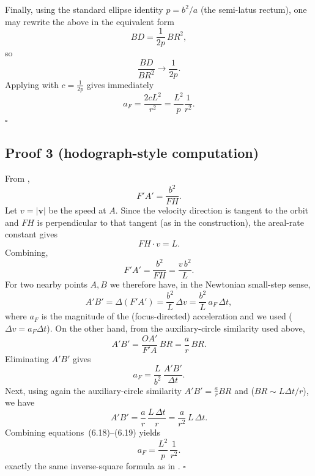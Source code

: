 Finally, using the standard ellipse identity $p=b^2/a$ (the semi-latus rectum), one may rewrite the above in the equivalent form
\begin{equation}
  BD=\frac{1}{2p}\,BR^2,
\end{equation}
so
\[
  \frac{BD}{BR^2}\to \frac{1}{2p}.
\]
Applying  with $c=\frac{1}{2p}$ gives immediately
\[
  a_F=\frac{2cL^2}{r^2}=\frac{L^2}{p}\frac{1}{r^2}.
\]
\hfill$\square$

\subsection{Proof 3 (hodograph-style computation)}
\label{subsec:proof3-hodograph}

From ,
\begin{equation}
  F'\!A'=\frac{b^2}{FH}.
\end{equation}
Let $v=\lvert \mathbf v\rvert$ be the speed at $A$. Since the velocity direction is tangent to the orbit and $FH$ is perpendicular to that tangent (as in the construction), the areal-rate constant gives
\begin{equation}
  FH\cdot v = L.
\end{equation}
Combining,
\begin{equation}
  F'\!A'=\frac{b^2}{FH}=\frac{v\,b^2}{L}.
\end{equation}
For two nearby points $A,B$ we therefore have, in the Newtonian small-step sense,
\begin{equation}
  A'B'=\Delta(F'\!A')=\frac{b^2}{L}\,\Delta v
  =\frac{b^2}{L}\,a_F\,\Delta t,
\end{equation}
where $a_F$ is the magnitude of the (focus-directed) acceleration and we used  ($\Delta v=a_F\Delta t$).
On the other hand, from the auxiliary-circle similarity used above,
\begin{equation}
  A'B'=\frac{OA'}{F'\!A}\,BR=\frac{a}{r}\,BR.
\end{equation}
Eliminating $A'B'$ gives
\begin{equation}
  a_F=\frac{L}{b^2}\,\frac{A'B'}{\Delta t}.
\end{equation}
Next, using again the auxiliary-circle similarity $A'B'=\frac{a}{r}BR$ and  ($BR\sim L\Delta t/r$), we have
\begin{equation}
  A'B'=\frac{a}{r}\,\frac{L\,\Delta t}{r}
  =\frac{a}{r^2}\,L\,\Delta t.
\end{equation}
Combining equations~(6.18)--(6.19) yields
\begin{equation}
  a_F=\frac{L^2}{p}\,\frac{1}{r^2}.
\end{equation}
exactly the same inverse-square formula as in .
\hfill$\square$

